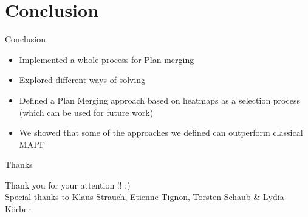 \section{Conclusion}
\begin{frame}{Conclusion}
\begin{itemize}
    \item Implemented a whole process for Plan merging
    \item Explored different ways of solving
    \item Defined a Plan Merging approach based on heatmaps as a selection process (which can be used for future work)
    \item We showed that some of the approaches we defined can outperform classical MAPF
\end{itemize}
\end{frame}


\begin{frame}{Thanks}
    
    \centering 
    Thank you for your attention !! :) \\[1cm] 
    
    Special thanks to Klaus Strauch, Etienne Tignon, Torsten Schaub \& Lydia Körber 

\end{frame}